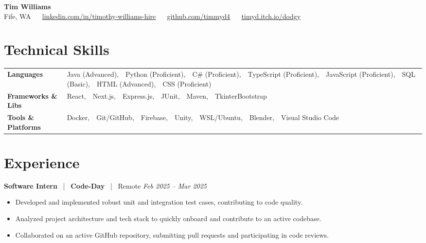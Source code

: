 \documentclass[10pt, letterpaper]{article}
\newcommand{\jobhead}[4]{%
  \vspace{5pt}%
  {\bfseries\color{dark}#1}%
  ~{\color{light}|}~%
  {\bfseries\color{navy}#2}%
  ~{\color{light}|}~%
  {\color{light}#3}%
  \hfill{\color{light}\small\textit{#4}}\\[-2pt]%
}
\newcommand{\skillrow}[2]{%
  {\bfseries #1} & #2 \\[2pt]%
}
\begin{document}

\begin{center}
  {\huge\bfseries\color{navy} Tim Williams}\\[4pt]
  {\small\color{light}
    Fife, WA
    ~\textbullet~
    \href{https://linkedin.com/in/timothy-williams-hire}{linkedin.com/in/timothy-williams-hire}
    ~\textbullet~
    \href{https://github.com/timmyd4}{github.com/timmyd4}
    ~\textbullet~
    \href{https://timyd.itch.io/dodgy}{timyd.itch.io/dodgy}
  }
\end{center}

\vspace{2pt}

\section{Technical Skills}

\begin{tabular}{@{}p{1.6in} p{5.2in}@{}}
  \skillrow{Languages}{Java (Advanced),\ \ Python (Proficient),\ \ C\# (Proficient),\ \ TypeScript (Proficient),\ \ JavaScript (Proficient),\ \ SQL (Basic),\ \ HTML (Advanced),\ \ CSS (Proficient)}
  \skillrow{Frameworks \& Libs}{React,\ \ Next.js,\ \ Express.js,\ \ JUnit,\ \ Maven,\ \ TkinterBootstrap}
  \skillrow{Tools \& Platforms}{Docker,\ \ Git/GitHub,\ \ Firebase,\ \ Unity,\ \ WSL/Ubuntu,\ \ Blender,\ \ Visual Studio Code}
\end{tabular}

\section{Experience}

\jobhead{Software Intern}{Code-Day}{Remote}{Feb 2025 – Mar 2025}
\begin{itemize}
  \item Developed and implemented robust unit and integration test cases, contributing to code quality.
  \item Analyzed project architecture and tech stack to quickly onboard and contribute to an active codebase.
  \item Collaborated on an active GitHub repository, submitting pull requests and participating in code reviews.
\end{itemize}
\end{document}
